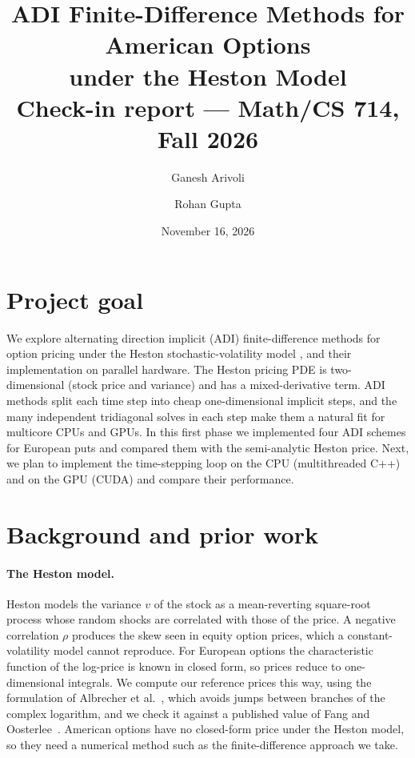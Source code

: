 \documentclass[11pt]{article}
\title{ADI Finite-Difference Methods for American Options\\under the Heston Model\\[6pt]
  \large Check-in report --- Math/CS 714, Fall 2026}
\author{Ganesh Arivoli \and Rohan Gupta\\[4pt]}
\date{November 16, 2026}
\begin{document}
\maketitle

\section{Project goal}
We explore alternating direction implicit (ADI) finite-difference methods for option pricing under the Heston
stochastic-volatility model \cite{heston1993}, and their implementation on parallel hardware. The Heston pricing
PDE is two-dimensional (stock price and variance) and has a mixed-derivative term. ADI methods split each time
step into cheap one-dimensional implicit steps, and the many independent tridiagonal solves in each step make
them a natural fit for multicore CPUs and GPUs. In this first phase we implemented four ADI schemes for European
puts and compared them with the semi-analytic Heston price. Next, we plan to implement the time-stepping loop on
the CPU (multithreaded C++) and on the GPU (CUDA) and compare their performance.

\section{Background and prior work}
\paragraph{The Heston model.}
Heston \cite{heston1993} models the variance $v$ of the stock as a mean-reverting square-root process whose
random shocks are correlated with those of the price. A negative correlation $\rho$ produces the skew seen in
equity option prices, which a constant-volatility model cannot reproduce. For European options the
characteristic function of the log-price is known in closed form, so prices reduce to one-dimensional
integrals. We compute our reference prices this way, using the formulation of Albrecher et
al.~\cite{albrecher2007}, which avoids jumps between branches of the complex logarithm, and we check it against
a published value of Fang and Oosterlee~\cite{fang2008}. American options have no closed-form price under the Heston
model, so they need a numerical method such as the finite-difference approach we take.
\end{document}
